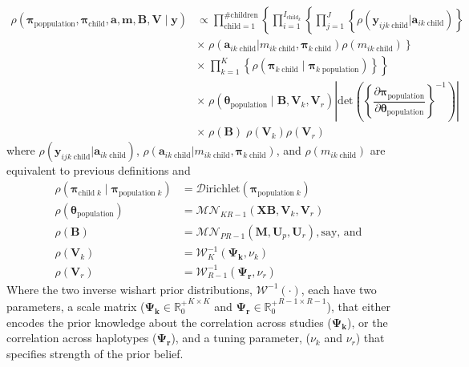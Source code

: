 \documentclass[letterpaper]{article}
\begin{document}
\small{
\begin{align} 
\rho(\bm{\pi}_{\text{poppulation}}, \bm{\pi}_{\text{child}}, \bm{a}, \bm{m}, \bm{B}, \bm{V} \mid \bm{y}) &\propto
\prod_{\text{child}=1}^{\# \text{children}}\left\{ \prod_{i=1}^{I_{\text{child}_k}} \left\{
\prod_{j=1}^J \left\{ \rho\left(\bm{y}_{ijk \; \text{child}}|\bm{a}_{ik\; \text{child}}\right)  \right\}  \right. \right. \nonumber\\  
&\left. \times \; \rho\left(\bm{a}_{ik\; \text{child}}|m_{ik\; \text{child}},\bm{\pi}_{k \;\text{child}}\right) \rho\left(m_{ik\; \text{child}}\right) \right\}  \nonumber\\
&\left. \times \; \prod_{k = 1}^K \left\{ \rho\left(\bm{\pi}_{k \; \text{child}} \mid \bm{\pi}_{k \; \text{population}}\right) \right\} \right\}  \nonumber\\
&\times \; \rho\left(\bm{\theta}_{\text{population}} \mid \bm{B}, \bm{V}_k, \bm{V}_r \right)
\left| \text{det}\left( \left\{\dfrac{\partial \bm{\pi}_{\text{population}}}{\partial \bm{\theta}_{\text{population}}}\right\}^{-1} \right)\right| \nonumber \\ 
&\times \;  \rho(\bm{B})\; \rho(\bm{V}_k) \rho(\bm{V}_r) 
\label{eq: joint model with child hierarchy}
\end{align}}
%
\normalsize
where $\rho\left(\bm{y}_{ijk \; \text{child} }|\bm{a}_{ik\; \text{child} }\right)$, 
$\rho\left(\bm{a}_{ik\; \text{child} }|m_{ik\; \text{child} },\bm{\pi}_{k \; \text{child} }\right)$, 
and $\rho\left(m_{ik\; \text{child}}\right)$  are equivalent to previous definitions  and
%
\begin{align}
\rho\left(\bm{\pi}_{\text{child} \; k} \mid \bm{\pi}_{\text{population} \; k} \right) &= \mathcal{D}\text{irichlet}(\bm{\pi}_{\text{population} \; k})\\
\rho\left(\bm{\theta}_{\text{population}} \right) &=
\mathcal{M}\mathcal{N}_{K R-1}(\bm{X}\bm{B},  \bm{V}_k, \bm{V}_r) \\
\rho(\bm{B}) &= \mathcal{M}\mathcal{N}_{P R-1}(\bm{M},  \bm{U}_p, \bm{U}_r), \text{say, and}\\
\rho(\bm{V}_k) &= \mathcal{W}_K^{-1}(\bm{\Psi_k}, \nu_k)\\
\rho(\bm{V}_r) &= \mathcal{W}_{R-1}^{-1}(\bm{\Psi_r}, \nu_r)
\end{align}
%
Where the two inverse wishart prior distributions, $\mathcal{W}^{-1}(\cdot)$, each have two parameters, a scale matrix ($\bm{\Psi_k} \in {\mathbb{R}^+_0}^{K \times K}$ and $\bm{\Psi_r}\in {\mathbb{R}^+_0}^{R-1 \times R-1}$), that either encodes the prior knowledge about the correlation across studies ($\bm{\Psi_k}$), or the correlation across haplotypes  ($\bm{\Psi_r}$), and a tuning parameter, ($\nu_k$ and $\nu_r$) that specifies strength of the prior belief. 
\end{document}
